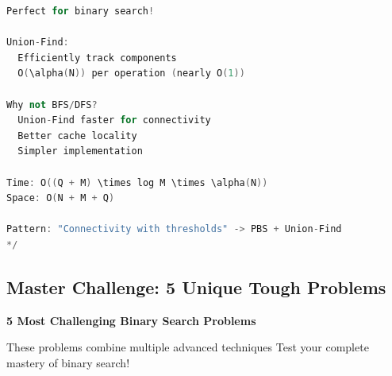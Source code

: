 \documentclass[11pt,a4paper,oneside]{book}
\begin{document}
\begin{lstlisting}[language=C++, caption=Graph Query Solutions - NEW PROBLEM]
  Perfect for binary search!

Union-Find:
  Efficiently track components
  O(\alpha(N)) per operation (nearly O(1))

Why not BFS/DFS?
  Union-Find faster for connectivity
  Better cache locality
  Simpler implementation

Time: O((Q + M) \times log M \times \alpha(N))
Space: O(N + M + Q)

Pattern: "Connectivity with thresholds" -> PBS + Union-Find
*/
\end{lstlisting}

\subsection{Master Challenge: 5 Unique Tough Problems}

\begin{tcolorbox}[
    enhanced,breakable,
    colback=dangered!10,
    colframe=dangered,
    boxrule=2pt,
    arc=4mm,
    title=\textbf{ELITE PROBLEMS - Complete Solutions}
]
\textbf{5 Most Challenging Binary Search Problems}

These problems combine multiple advanced techniques
Test your complete mastery of binary search!
\end{tcolorbox}
\end{document}

